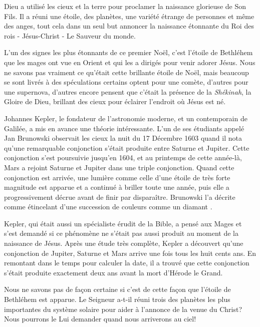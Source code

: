 


Dieu a utilisé les cieux et la terre pour proclamer la naissance glorieuse de Son Fils. Il a réuni une étoile, des planètes, une variété étrange de personnes et même des anges, tout cela dans un seul but\frcolon{} annoncer la naissance étonnante du Roi des rois - Jésus-Christ - Le Sauveur du monde.

L'un des signes les plus étonnants de ce premier Noël, c'est l'étoile de Bethléhem que les mages ont vue en Orient et qui les a dirigés pour venir adorer Jésus. Nous ne savons pas vraiment ce qu'était cette brillante étoile de Noël, mais beaucoup se sont livrés à des spéculations\frcolon{} certains optent pour une comète, d'autres pour une supernova, d'autres encore pensent que c'était la présence de la \emph{Shékinah}, la Gloire de Dieu, brillant des cieux pour éclairer l'endroit où Jésus est né.

Johannes Kepler, le fondateur de l'astronomie moderne, et un contemporain de Galilée, a mis en avance une théorie intéressante. L'un de ses étudiants appelé Jan Brunowski observait les cieux la nuit du 17 Décembre 1603 quand il nota qu'une remarquable conjonction s'était produite entre Saturne et Jupiter. Cette conjonction s'est poursuivie jusqu'en 1604, et au printemps de cette année-là, Mars a rejoint Saturne et Jupiter dans une triple conjonction. Quand cette conjonction est arrivée, une lumière comme celle d'une étoile de très forte magnitude est apparue et a continué à briller toute une année, puis elle a progressivement décrue avant de finir par disparaître. Brunowski l'a décrite comme \og étincelant d'une succession de couleurs comme un diamant \fg{}.

Kepler, qui était aussi un spécialiste érudit de la Bible, a pensé aux Mages et s'est demandé si ce phénomène ne s'était pas aussi produit au moment de la naissance de Jésus. Après une étude très complète, Kepler a découvert qu'une conjonction de Jupiter, Saturne et Mars arrive une fois tous les huit cents ans. En remontant dans le temps pour calculer la date, il a trouvé que cette conjonction s'était produite exactement deux ans avant la mort d'Hérode le Grand.

Nous ne savons pas de façon certaine si c'est de cette façon que l'étoile de Bethléhem est apparue. Le Seigneur a-t-il réuni trois des planètes les plus importantes du système solaire pour aider à l'annonce de la venue du Christ? Nous pourrons le Lui demander quand nous arriverons au ciel!




